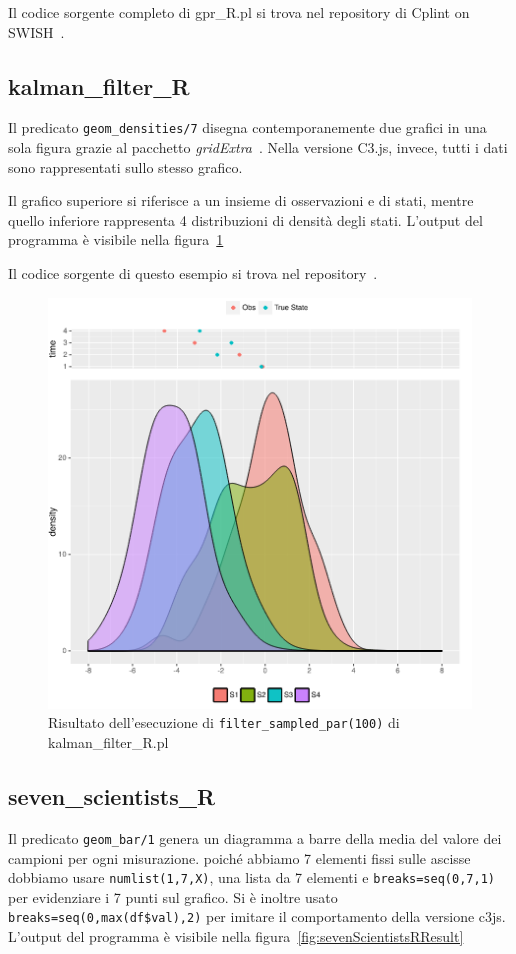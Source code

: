 \documentclass[10pt,titlepage,twoside,a4paper]{report}
\begin{document}
Il codice sorgente completo di gpr\_R.pl si trova nel repository di 
Cplint on SWISH~\cite{gprRpl}.

\subsection{kalman\_filter\_R}
Il predicato \texttt{geom\_densities/7} disegna contemporanemente
due grafici in una sola figura grazie al pacchetto
\emph{gridExtra}~\cite{gridExtra}. Nella versione C3.js, invece, tutti i dati 
sono rappresentati sullo stesso grafico.

Il grafico superiore si riferisce a un insieme di osservazioni e di stati, 
mentre quello inferiore rappresenta 4 distribuzioni di densità degli stati.
L'output del programma è visibile nella figura~\ref{fig:kalmanFilterRResult}

Il codice sorgente di questo esempio si trova nel repository~\cite{kalmanFilterRpl}.

\begin{figure}[H]
\centering
\caption{Risultato dell'esecuzione di \texttt{filter\_sampled\_par(100)} di kalman\_filter\_R.pl}
\label{fig:kalmanFilterRResult}
\includegraphics[width=.5\linewidth]{kalman_filter_R_plot.png}
\end{figure}

\subsection{seven\_scientists\_R}
Il predicato \texttt{geom\_bar/1}  genera un diagramma a barre 
della media del valore dei campioni per ogni misurazione. poiché 
abbiamo 7 elementi fissi sulle ascisse dobbiamo usare \texttt{numlist(1,7,X)}, 
una lista da 7 elementi e \texttt{breaks=seq(0,7,1)} per evidenziare i 7 
punti sul grafico. Si è inoltre usato \texttt{breaks=seq(0,max(df\$val),2)} 
per imitare il comportamento della versione c3js. L'output del programma è 
visibile nella figura~\ref{fig:sevenScientistsRResult}
\end{document}
